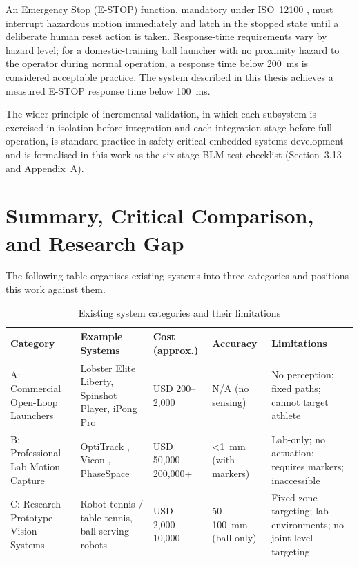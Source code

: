 An Emergency Stop (E-STOP) function, mandatory under ISO~12100 \cite{ref22}, must interrupt hazardous motion immediately and latch in the stopped state until a deliberate human reset action is taken. Response-time requirements vary by hazard level; for a domestic-training ball launcher with no proximity hazard to the operator during normal operation, a response time below 200~ms is considered acceptable practice. The system described in this thesis achieves a measured E-STOP response time below 100~ms.

The wider principle of incremental validation, in which each subsystem is exercised in isolation before integration and each integration stage before full operation, is standard practice in safety-critical embedded systems development \cite{ref23} and is formalised in this work as the six-stage BLM test checklist (Section~3.13 and Appendix~A).

\section{Summary, Critical Comparison, and Research Gap}

The following table organises existing systems into three categories and positions this work against them.

\begin{table}[htbp]
\caption{Existing system categories and their limitations}
\label{tab:2_1}
\begin{tabular}{|p{2cm}|p{3cm}|p{1.8cm}|p{1.8cm}|p{3.5cm}|}
\hline
\textbf{Category} & \textbf{Example Systems} & \textbf{Cost (approx.)} & \textbf{Accuracy} & \textbf{Limitations} \\
\hline
A: Commercial Open-Loop Launchers & Lobster Elite Liberty, Spinshot Player, iPong Pro & USD 200--2{,}000 & N/A (no sensing) & No perception; fixed paths; cannot target athlete \\
\hline
B: Professional Lab Motion Capture & OptiTrack \cite{ref30}, Vicon \cite{ref8}, PhaseSpace \cite{ref31} & USD 50{,}000--200{,}000+ & \textless{}1~mm (with markers) & Lab-only; no actuation; requires markers; inaccessible \\
\hline
C: Research Prototype Vision Systems & Robot tennis / table tennis, ball-serving robots \cite{ref24, ref25} & USD 2{,}000--10{,}000 & 50--100~mm (ball only) & Fixed-zone targeting; lab environments; no joint-level targeting \\
\hline
\end{tabular}
\end{table}

